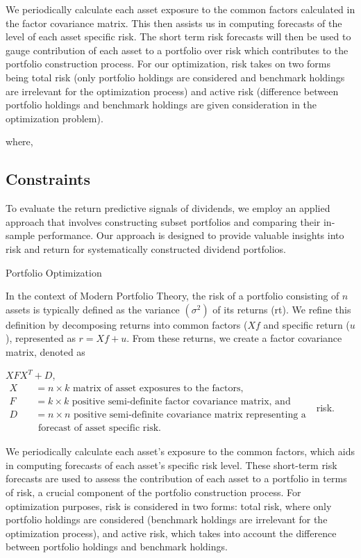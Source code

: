 \documentclass[11pt,preprint, authoryear]{elsarticle}
\numberwithin{equation}{section}
\numberwithin{figure}{section}
\numberwithin{table}{section}
\begin{document}
We periodically calculate each asset exposure to the common factors
calculated in the factor covariance matrix. This then assists us in
computing forecasts of the level of each asset specific risk. The short
term risk forecasts will then be used to gauge contribution of each
asset to a portfolio over risk which contributes to the portfolio
construction process. For our optimization, risk takes on two forms
being total risk (only portfolio holdings are considered and benchmark
holdings are irrelevant for the optimization process) and active risk
(difference between portfolio holdings and benchmark holdings are given
consideration in the optimization problem).

where,

\hypertarget{constraints}{%
\subsection*{Constraints}\label{constraints}}

To evaluate the return predictive signals of dividends, we employ an
applied approach that involves constructing subset portfolios and
comparing their in-sample performance. Our approach is designed to
provide valuable insights into risk and return for systematically
constructed dividend portfolios.

Portfolio Optimization

In the context of Modern Portfolio Theory, the risk of a portfolio
consisting of \(n\) assets is typically defined as the variance
\((\sigma^2)\) of its returns (rt). We refine this definition by
decomposing returns into common factors (\(Xf\) and specific return
(\(u\)), represented as \(r = Xf + u\). From these returns, we create a
factor covariance matrix, denoted as

\(XFX^T + D\),\(\begin{array} {ll}X & =n \times k \text { matrix of asset exposures to the factors, } \\ F \quad &= k \times k \text { positive semi-definite factor covariance matrix, and } \\ D \quad &=n \times n \text { positive semi-definite covariance matrix representing a } \\ & \text { forecast of asset specific risk. }\end{array}\)
risk.

We periodically calculate each asset's exposure to the common factors,
which aids in computing forecasts of each asset's specific risk level.
These short-term risk forecasts are used to assess the contribution of
each asset to a portfolio in terms of risk, a crucial component of the
portfolio construction process. For optimization purposes, risk is
considered in two forms: total risk, where only portfolio holdings are
considered (benchmark holdings are irrelevant for the optimization
process), and active risk, which takes into account the difference
between portfolio holdings and benchmark holdings.
\end{document}

